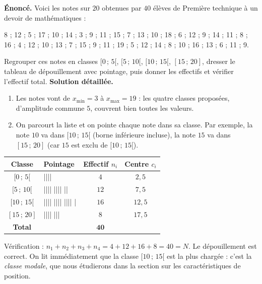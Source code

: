 \documentclass[11pt]{article}
\begin{document}
\begin{exoresolu}
\textbf{Énoncé.} Voici les notes sur $20$ obtenues par $40$ élèves de Première technique à un devoir de mathématiques :
\begin{center}
\small
8 ; 12 ; 5 ; 17 ; 10 ; 14 ; 3 ; 9 ; 11 ; 15 ; 7 ; 13 ; 10 ; 18 ; 6 ; 12 ; 9 ; 14 ; 11 ; 8 ;\\
16 ; 4 ; 12 ; 10 ; 13 ; 7 ; 15 ; 9 ; 11 ; 19 ; 5 ; 12 ; 14 ; 8 ; 10 ; 16 ; 13 ; 6 ; 11 ; 9.
\end{center}
Regrouper ces notes en classes $[0\,;\,5[$, $[5\,;\,10[$, $[10\,;\,15[$, $[15\,;\,20]$, dresser le tableau de dépouillement avec pointage, puis donner les effectifs et vérifier l'effectif total.
\tcblower
\textbf{Solution détaillée.}
\begin{enumerate}
\item Les notes vont de $x_{\min} = 3$ à $x_{\max} = 19$ : les quatre classes proposées, d'amplitude commune $5$, couvrent bien toutes les valeurs.
\item On parcourt la liste et on pointe chaque note dans sa classe. Par exemple, la note $10$ va dans $[10\,;\,15[$ (borne inférieure incluse), la note $15$ va dans $[15\,;\,20]$ (car $15$ est exclu de $[10\,;\,15[$).
\end{enumerate}
\begin{center}
\begin{tabularx}{\linewidth}{|c|X|c|c|}
\hline
\rowcolor{popblueL} \textbf{Classe} & \textbf{Pointage} & \textbf{Effectif } $n_i$ & \textbf{Centre } $c_i$ \\
\hline
$[0\,;\,5[$ & |||| & $4$ & $2{,}5$ \\
\hline
$[5\,;\,10[$ & |||| |||| \;|| & $12$ & $7{,}5$ \\
\hline
$[10\,;\,15[$ & |||| |||| |||| \;| & $16$ & $12{,}5$ \\
\hline
$[15\,;\,20]$ & |||| \;||| & $8$ & $17{,}5$ \\
\hline
\rowcolor{popcream} \textbf{Total} & & $\mathbf{40}$ & \\
\hline
\end{tabularx}
\end{center}
Vérification : $n_1 + n_2 + n_3 + n_4 = 4 + 12 + 16 + 8 = 40 = N$. Le dépouillement est correct. On lit immédiatement que la classe $[10\,;\,15[$ est la plus chargée : c'est la \emph{classe modale}, que nous étudierons dans la section sur les caractéristiques de position.
\end{exoresolu}
\end{document}
